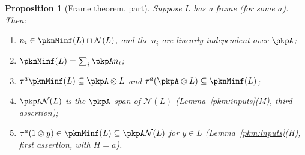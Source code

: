 \documentclass[10pt]{amsart}
\newtheorem{proposition}[theorem]{Proposition}
\theoremstyle{definition}
\theoremstyle{remark}
\begin{document}
\begin{proposition}[Frame theorem, part]\label{pkn:frame}
Suppose $L$ has a frame (for some $a$). Then:
\begin{enumerate}
\item[(i)] $n_i\in\pknMinf(L)\cap\mathcal N(L)$, and the $n_i$ are linearly independent over $\pkpA$;
\item[(ii)] $\pknMinf(L)=\sum_i\pkpA n_i$;
\item[(iii)] $\tau^a\pknMinf(L)\subseteq\pkpA\otimes L$ and $\tau^a(\pkpA\otimes L)\subseteq\pknMinf(L)$;
\item[(iv)] $\pkpA\mathcal N(L)$ is the $\pkpA$-span of $\mathcal N(L)$ (Lemma~\ref{pkm:inputs}(M), third
assertion);
\item[(v)] $\tau^a(1\otimes y)\in\pknMinf(L)\subseteq\pkpA\mathcal N(L)$ for $y\in L$
(Lemma~\ref{pkm:inputs}(H), first assertion, with $H=a$).
\end{enumerate}
\end{proposition}
\end{document}
